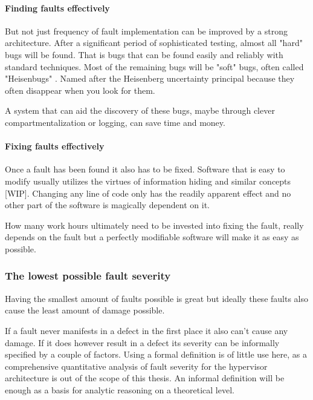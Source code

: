 \paragraph{Finding faults effectively}
But not just frequency of fault implementation can be improved by a strong architecture. After a significant period of sophisticated testing, almost all "hard" bugs will be found. That is bugs that can be found easily and reliably
with standard techniques. Most of the remaining bugs will be "soft" bugs, often called "Heisenbugs" \cite{Gray.1986}. Named after the Heisenberg uncertainty principal because they often disappear when you look for them. 

A system that can aid the discovery of these bugs, maybe through clever compartmentalization or logging, can save time and money.
\paragraph{Fixing faults effectively}
Once a fault has been found it also has to be fixed. Software that is easy to modify usually utilizes the virtues of information hiding and similar  concepts [WIP]. Changing any line of code only has the readily apparent effect and no other part of the software is magically dependent on it.

How many work hours ultimately need to be invested into fixing the fault, really depends on the fault but a perfectly modifiable software will make it as easy as possible.
\subsubsection{The lowest possible fault severity}
Having the smallest amount of faults possible is great but ideally these faults also cause the least amount of damage possible. 

If a fault never manifests in a defect in the first place it also can't cause any damage. If it does however result in a defect its severity can be informally specified by a couple of factors. Using a formal definition is of little use here, as a comprehensive quantitative analysis of fault severity for the hypervisor architecture is out of the scope of this thesis. An informal definition will be enough as a basis for analytic reasoning on a theoretical level.
